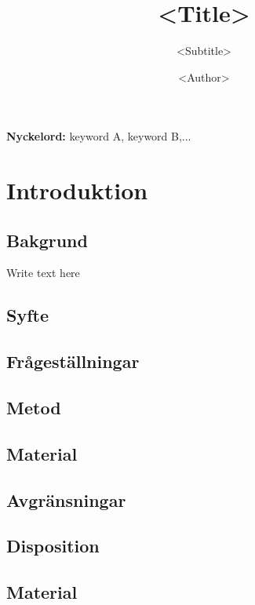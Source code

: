 \documentclass{theme/borgar}
\title{<Title>}
\subtitle{<Subtitle>}
\author{<Author>}
\begin{document}

	\maketitle


	\begin{abstract}
		\lipsum[1-2]
	\end{abstract}


	\begin{flushleft}
		{\small {\bf Nyckelord:} keyword A, keyword B,...}
	\end{flushleft}

	\tableofcontents

	\clearpage

	\section{Introduktion}

	\subsection{Bakgrund}
	Write text here
	\subsection{Syfte}
		\lipsum[1-2]
	\subsection{Frågeställningar}
		\lipsum[1-2]
	\subsection{Metod}
		\lipsum[1-2]
	\subsection{Material}
		\lipsum[1-2]
	\subsection{Avgränsningar}
		\lipsum[1-2]
	\subsection{Disposition}
		\lipsum[1-2]
	\subsection{Material}
		\lipsum[1-2]
\end{document}
